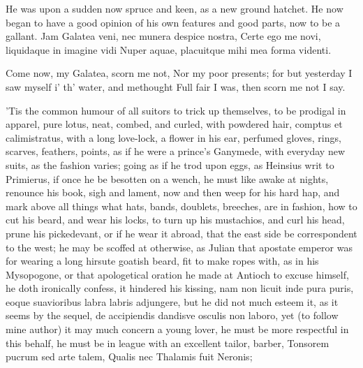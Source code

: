 {He was upon a sudden now spruce and keen, as a new ground hatchet. He
now began to have a good opinion of his own features and good parts,
now to be a gallant.
Jam Galatea veni, nec munera despice nostra,
Certe ego me novi, liquidaque in imagine vidi
Nuper aquae, placuitque mihi mea forma videnti.

Come now, my Galatea, scorn me not,
Nor my poor presents; for but yesterday
I saw myself i' th' water, and methought
Full fair I was, then scorn me not I say.


'Tis the common humour of all suitors to trick up themselves, to be
prodigal in apparel, pure lotus, neat, combed, and curled, with
powdered hair, comptus et calimistratus, with a long love-lock, a
flower in his ear, perfumed gloves, rings, scarves, feathers, points,
\etc{} as if he were a prince's Ganymede, with everyday new suits, as the
fashion varies; going as if he trod upon eggs, as Heinsius writ to
Primierus, if once he be besotten on a wench, he must like awake
at nights, renounce his book, sigh and lament, now and then weep for
his hard hap, and mark above all things what hats, bands, doublets,
breeches, are in fashion, how to cut his beard, and wear his locks, to
turn up his mustachios, and curl his head, prune his pickedevant, or if
he wear it abroad, that the east side be correspondent to the west; he
may be scoffed at otherwise, as Julian that apostate emperor was for
wearing a long hirsute goatish beard, fit to make ropes with, as in his
Mysopogone, or that apologetical oration he made at Antioch to excuse
himself, he doth ironically confess, it hindered his kissing, nam non
licuit inde pura puris, eoque suavioribus labra labris adjungere, but
he did not much esteem it, as it seems by the sequel, de accipiendis
dandisve osculis non laboro, yet (to follow mine author) it may much
concern a young lover, he must be more respectful in this behalf, he
must be in league with an excellent tailor, barber,
Tonsorem pucrum sed arte talem,
Qualis nec Thalamis fuit Neronis;

}
